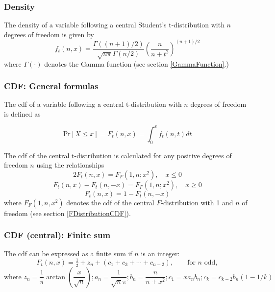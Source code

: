 \subsubsection{Density}
\label{tDistributionDensity}
The density of a variable following a central Student's t-distribution with $n$ degrees of freedom is given by
\begin{equation}
	f_t(n,x) = \frac{\Gamma((n+1)/2)}{\sqrt{n\pi}\Gamma(n/2)} \left(\frac{n}{n+t^2}\right)^{(n+1)/2}
\end{equation}
where $\Gamma(\cdot)$ denotes the Gamma function (see section \ref{GammaFunction}.)



\subsubsection{CDF: General formulas}
\label{tDistributionCDF}
The cdf of a variable following a central  t-distribution with $n$ degrees of freedom is defined as

\begin{equation}
	\text{Pr}\left[X \le x\right] = F_t\left(n,x\right) =  \int_{0}^{x} f_t(n,t) dt
\end{equation}

The cdf of the central t-distribution is calculated for any positive degrees of freedom $n$ using the relationships
\begin{equation}
	2F_t\left(n,x\right) = F_F(1,n;x^2), \quad x \leq 0
\end{equation}
\begin{equation}
	F_t\left(n,x\right)-F_t\left(n,-x\right)  = F_F(1,n;x^2), \quad x \geq 0
\end{equation}
\begin{equation}
	F_t\left(n,x\right) = 1-F_t\left(n,-x\right) 
\end{equation}
where $F_F(1,n,x^2)$ denotes the cdf of the central $F$-distribution with 1 and $n$ of freedom (see section \ref{FDistributionCDF}).




\subsubsection{CDF (central): Finite sum}
The cdf can be expressed as a finite sum if $n$ is an integer:
\begin{equation}
F_t\left(n,x\right) =  \tfrac{1}{2} + z_n + (c_1 + c_3 +  \cdots +c_{n-2}), \qquad \text{for } n \text{ odd},
\end{equation}
\begin{equation}
\text{where } z_n=\frac{1}{\pi} \arctan(\frac{x}{\sqrt{n}}); a_n=\frac{1}{\sqrt{n}\pi}; b_n=\frac{n}{n+x^2}; c_1=xa_nb_n; c_k=c_{k-2}b_n(1-1/k) 
\end{equation} 

